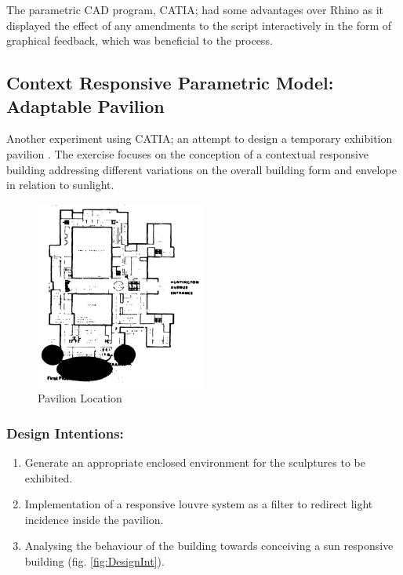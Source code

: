 The parametric CAD program, CATIA; had some advantages over Rhino as it displayed the effect of any amendments to the script interactively in the form of graphical feedback, which was beneficial to the process. 

\subsection{Context Responsive Parametric Model: Adaptable Pavilion}
\label{sec:AdptPav}

Another experiment using CATIA; an attempt to design a temporary exhibition pavilion \cite{zulas04}. The exercise focuses on the conception of a contextual responsive building addressing different variations on the overall building form and envelope in relation to sunlight. 

\begin{figure}[htbp]
\centering
\includegraphics[width=0.5\textwidth]{./Images/4-Location}
\caption[Case Study Location]{Pavilion Location \cite{zulas04}}
\label{fig:PvlLoc}
\end{figure}

\subsubsection{Design Intentions:} 

\begin{enumerate}
\item Generate an appropriate enclosed environment for the sculptures to be exhibited.
\item Implementation of a responsive louvre system as a filter to redirect light incidence inside the pavilion.
\item Analysing the behaviour of the building towards conceiving a sun responsive building (fig. \ref{fig:DesignInt}). 
\end{enumerate}

